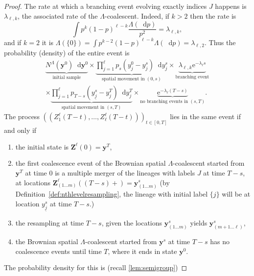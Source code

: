 \documentclass[reqno,draft]{amsart}
\numberwithin{equation}{section}
\theoremstyle{plain}
\theoremstyle{remark}
\newcommand*\diff{\mathop{}\!\mathrm{d}}
\newcommand{\e}{\mathrm{e}}
\begin{document}
\begin{proof}
    The rate at which a branching event evolving exactly indices $J$ happens is $\lambda_{\ell,k}$, the associated rate of the $\Lambda$-coalescent. Indeed, if $k > 2$ then the rate is \[
        \int p^k (1-p)^{\ell-k} \frac{\Lambda(\diff p)}{p^2} = \lambda_{\ell,k},
    \] and if $k = 2$ it is $\Lambda(\{0\}) = \int p^{k-2} (1-p)^{\ell-k} \Lambda(\diff p) = \lambda_{\ell,2}$. Thus the probability (density) of the entire event is
    \begin{multline}\label{eq:prfxifv:1}
        \underbrace{N^\Lambda(\boldsymbol y^0) \diff \boldsymbol y^0}_{\text{initial sample}} \times
        \underbrace{\prod_{j=1}^\ell p_s(y^0_j-y^s_j)\diff y^s_j }_{\text{spatial movement in $(0,s)$}}
        \times \underbrace{\lambda_{\ell,k} \e^{-\lambda_\ell s}}_{\text{branching event}} \\
        \times \underbrace{\prod_{j=1}^\ell p_{T-s}(y^s_{\underline{j}} - y^T_j) \diff y^T_j}_{\text{spatial movement in $(s,T)$}}
        \times \underbrace{\e^{-\lambda_\ell(T-s)}}_{\text{no branching events in $(s,T)$}} .
    \end{multline}
    The process $((Z^\ell_1(T-t), \ldots ,Z^\ell_\ell(T-t)))_{t\in [0,T]}$ lies in the same event if and only if
    \begin{enumerate}
        \item the initial state is $\boldsymbol Z^\ell(0) = \boldsymbol y^T$,
        \item the first coalescence event of the Brownian spatial $\Lambda $-coalescent started from $\boldsymbol y^T$ at time $0$ is a multiple merger of the lineages with labels $J$ at time $T-s$, at locations $\boldsymbol Z^\ell_{(1\ldots m)}((T-s)+)=\boldsymbol y^{s}_{(1\ldots m)}$ (by Definition~\ref{def:nthlevelresampling}, the lineage with initial label $\{j\}$ will be at location $y^s_{\underline{j}}$ at time $T-s$.)
        \item the resampling at time $T-s$, given the locations $\boldsymbol y^{s}_{(1\ldots m)}$ yields $\boldsymbol y^{s}_{(m+1\ldots \ell)}$,
        \item the Brownian spatial $\Lambda$-coalescent started from $\boldsymbol y^s$ at time $T-s$ has no coalescence events until time $T$, where it ends in state $\boldsymbol y^0$.
    \end{enumerate}
    The probability density for this is (recall \cref{lem:semigroup})

\end{proof}
\end{document}
